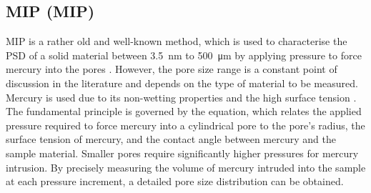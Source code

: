 
\subsection{\Acl*{MIP} (\acs*{MIP})}
\label{sec:mip}
\ac{MIP} is a rather old and well-known method, which is used to characterise the \ac{PSD} of a solid material between \qty{3.5}{\nano\meter} to \qty{500}{\micro\meter} by applying pressure to force mercury into the pores \cite{giesche.2002}. %
However, the pore size range is a constant point of discussion in the literature and depends on the type of material to be measured. %
Mercury is used due to its non-wetting properties and the high surface tension \cite{giesche.2002}. %
The fundamental principle is governed by the \textcite{washburn.1921} equation, which relates the applied pressure required to force mercury into a cylindrical pore to the pore's radius, the surface tension of mercury, and the contact angle between mercury and the sample material.
Smaller pores require significantly higher pressures for mercury intrusion.
By precisely measuring the volume of mercury intruded into the sample at each pressure increment, a detailed pore size distribution can be obtained.

